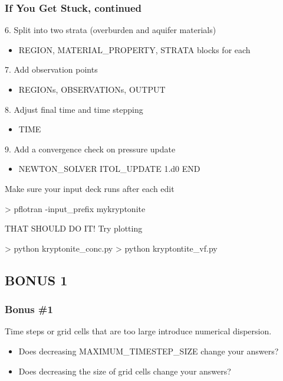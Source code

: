 \documentclass{beamer}
\newcommand\redcomment[1]{{{\color{red} #1}}}
\begin{document}
\begin{frame}[fragile]\frametitle{If You Get Stuck, continued}
6. Split into two strata (overburden and aquifer materials)
\begin{itemize}\small
  \item{REGION, MATERIAL\_PROPERTY, STRATA blocks for each}
\end{itemize}
7. Add observation points
\begin{itemize}\small
  \item{REGIONs, OBSERVATIONs, OUTPUT}
\end{itemize}
8. Adjust final time and time stepping
\begin{itemize}\small
  \item{TIME}
\end{itemize}
9. Add a convergence check on pressure update
\begin{itemize}\small
  \item{NEWTON\_SOLVER ITOL\_UPDATE 1.d0 END}
\end{itemize}
Make sure your input deck runs after each edit
\begin{semiverbatim}
  > pflotran -input\_prefix mykryptonite
\end{semiverbatim}
\redcomment{THAT SHOULD DO IT!} Try plotting
\begin{semiverbatim}
  > python kryptonite_conc.py
  > python kryptontite_vf.py
\end{semiverbatim}

\end{frame}
\subsection{BONUS 1}

\begin{frame}[fragile]\frametitle{Bonus \#1}
Time steps or grid cells that are too large introduce numerical dispersion.

\begin{itemize}
  \item Does decreasing MAXIMUM\_TIMESTEP\_SIZE change your answers?
  \item Does decreasing the size of grid cells change your answers?
\end{itemize}

\end{frame}

\end{document}
